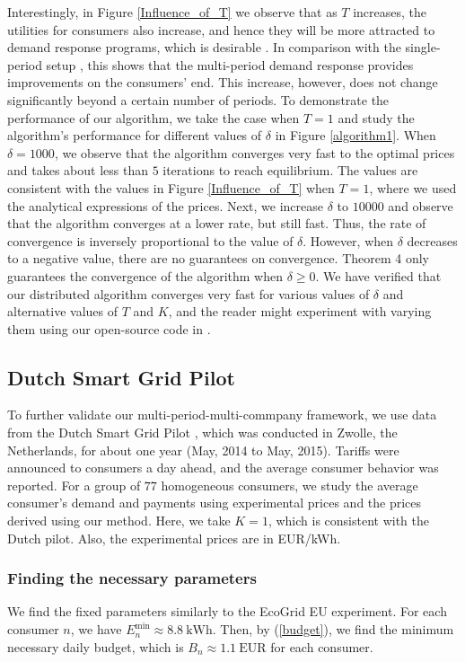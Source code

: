 Interestingly, in Figure \ref{Influence_of_T} we observe that as $T$ increases, the utilities for consumers also increase, and hence they will be more attracted to demand response programs, which is desirable \cite{DOECOM}. In comparison with the single-period setup \cite{sabita,sabita2}, this shows that the multi-period demand response provides improvements on the consumers' end. This increase, however, does not change significantly beyond a certain number of periods.
To demonstrate the performance of our algorithm, we take the case when $T=1$ and study the algorithm's performance for different values of $\delta$ in Figure \ref{algorithm1}. When $\delta=1000$, we observe that the algorithm converges very fast to the optimal prices and takes about less than $5$ iterations to reach equilibrium. The values are consistent with the values in Figure  \ref{Influence_of_T} when $T=1$, where we used the analytical expressions of the prices. Next, we increase $\delta$ to $10000$ and observe that the algorithm converges at a lower rate, but still fast. Thus, the rate of convergence is inversely proportional to the value of $\delta$. However, when $\delta$ decreases to a negative value, there are no guarantees on convergence. Theorem 4 only guarantees the convergence of the algorithm when $\delta\geq0$. We have verified that our distributed algorithm converges very fast for various values of $\delta$ and alternative values of $T$ and $K$, and the reader might experiment with varying them using our open-source code in \cite{tool2}.

\subsection{Dutch Smart Grid Pilot} {\color{black} To further validate our multi-period-multi-commpany framework, we use data from the Dutch Smart Grid Pilot \cite{dutch}, which was conducted in Zwolle, the Netherlands, for about one year (May, 2014 to May, 2015). Tariffs were announced to consumers a day ahead, and the average consumer behavior was reported}. For a group of $77$ homogeneous consumers, we study the average consumer's demand and payments using experimental prices and the prices derived using our method. Here, we take $K=1$, which is consistent with the Dutch pilot. Also, the experimental prices are in EUR/kWh. 
 
  \subsubsection{Finding the necessary parameters}{\color{black} We find the fixed parameters similarly to the EcoGrid EU experiment. For each consumer $n$, we have {\color{black}$E_n^{\min} \approx 8.8 \ \text{kWh}$.} Then, by (\ref{budget}), we find the minimum necessary daily budget, which is $B_n \approx 1.1\ \text{EUR}$ for each consumer}.


